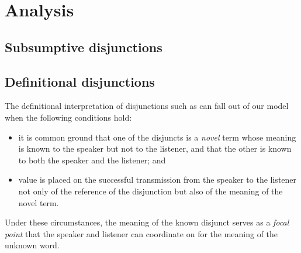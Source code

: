 \documentclass{article}
\begin{document}

\section{Analysis}\label{sec:analysis}

\subsection{Subsumptive disjunctions}\label{sec:analysis:subsumptive}

\subsection{Definitional disjunctions}\label{sec:analysis:definitional}

\begin{examples}
\item The definitional interpretation of disjunctions such as can fall
  out of our model when the following conditions hold:
%
  \begin{itemize}
  \item it is common ground that one of the disjuncts is a
    \emph{novel} term whose meaning is known to the speaker but not to
    the listener, and that the other is known to both the speaker and
    the listener; and
  \item value is placed on the successful transmission from the
    speaker to the listener not only of the reference of the
    disjunction but also of the meaning of the novel term.
  \end{itemize}
  Under these circumstances, the meaning of the known disjunct serves
  as a \emph{focal point} that the speaker and listener can coordinate
  on for the meaning of the unknown word.
\end{examples}




\end{document}
